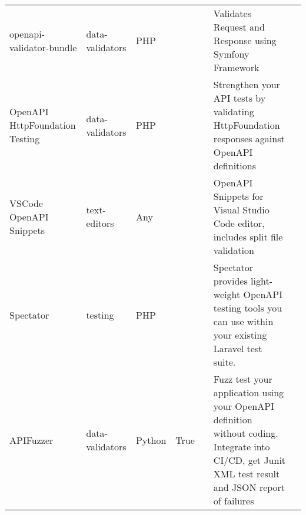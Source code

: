 \begin{table*}[htb]
{\begin{tabular}{p{2cm}p{2cm}p{2cm}p{2cm}p{2cm}p{4cm}p{2cm}}
openapi-validator-bundle & data-validators & PHP &  &  & Validates Request and Response using Symfony Framework \\
OpenAPI HttpFoundation Testing & data-validators & PHP &  &  & Strengthen your API tests by validating HttpFoundation responses against OpenAPI definitions \\
VSCode OpenAPI Snippets & text-editors & Any &  &  & OpenAPI Snippets for Visual Studio Code editor, includes split file validation \\
Spectator & testing & PHP &  &  & Spectator provides light-weight OpenAPI testing tools you can use within your existing Laravel test suite. \\
APIFuzzer & data-validators & Python & True &  & Fuzz test your application using your OpenAPI definition without coding. Integrate into CI/CD, get Junit XML test result and JSON report of failures \\
\end{tabular}
}
\end{table*}
